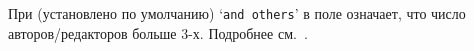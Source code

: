 \documentclass[10pt,a4paper,headings=small,numbers=enddot,english,russian]{ltxdockit}
\newcommand*{\biber}{Biber\xspace}
\newcommand*{\biblatex}{Biblatex\xspace}
\begin{document}
\begin{trivlist}
\item При  (установлено по умолчанию) `\texttt{and others}' 
  в поле 
  означает, что число авторов/редакторов больше 3-х. Подробнее см.~.
\end{trivlist}



% 
\end{document}
